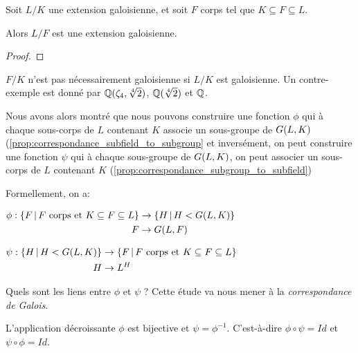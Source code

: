 \begin{proposition}
	Soit $L/K$ une extension galoisienne, et soit $F$ corps tel que $K \subseteq
	F \subseteq L$.

	Alors $L/F$ est une extension galoisienne.
\end{proposition}

\ifdefined\outputproof
\begin{proof}

\end{proof}
\fi

\begin{remarque}
	$F/K$ n'est pas nécessairement galoisienne si $L/K$ est
	galoisienne. Un contre-exemple est donné par $\mathbb{Q}(\zeta_{4},
	\sqrt[4]{2})$, $\mathbb{Q}(\sqrt[4]{2})$ et $\mathbb{Q}$.
\end{remarque}

Nous avons alors montré que nous pouvons construire une fonction $\phi$ qui à
chaque sous-corps de $L$ contenant $K$ associe un sous-groupe de
$G(L, K)$ (\ref{prop:correspondance_subfield_to_subgroup} et
inversément, on peut construire une fonction $\psi$ qui à chaque sous-groupe de
$G(L, K)$, on peut associer un sous-corps de $L$ contenant $K$
(\ref{prop:correspondance_subgroup_to_subfield})

Formellement, on a:

\begin{center}
	$
	\begin{aligned}
		\phi :
			\left\{F \, | \, F \text{ corps et } K \subseteq F \subseteq L \right\}
			&\rightarrow \left\{H \, | \, H < G(L, K) \right\}
			\\
			F &\rightarrow G(L, F)
	\end{aligned}
	$

	$
	\begin{aligned}
		\psi :
			\left\{H \, | \, H < G(L, K) \right\}
			&\rightarrow
			\left\{F \, | \, F \text{ corps et } K \subseteq F \subseteq L \right\}
			\\
			H &\rightarrow L^{H}
	\end{aligned}
	$
\end{center}

Quels sont les liens entre $\phi$ et $\psi$ ?
Cette étude va nous mener à la \textit{correspondance de Galois}.

\begin{theorem}
	\label{theorem:galois_correspondance}
	L'application décroissante $\phi$ est bijective et $\psi = \phi^{-1}$.
	C'est-à-dire $\phi \circ \psi = Id$ et $\psi \circ \phi = Id$.
\end{theorem}

